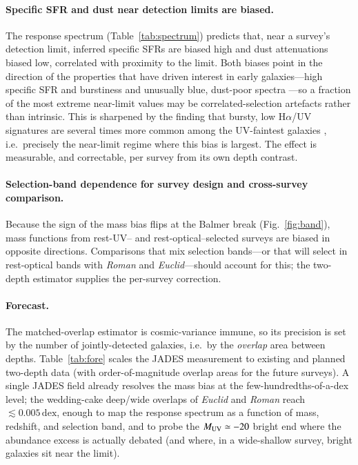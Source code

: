 \documentclass{aa}
\newcommand{\dex}{\,\mathrm{dex}}
\begin{document}
\paragraph{Specific SFR and dust near detection limits are biased.} The response spectrum
(Table~\ref{tab:spectrum}) predicts that, near a survey's detection limit, inferred specific SFRs
are biased high and dust attenuations biased low, correlated with proximity to the limit. Both
biases point in the direction of the properties that have driven interest in early galaxies---high
specific SFR and burstiness \citep{Ciesla2024,Endsley2024} and unusually blue, dust-poor spectra
\citep{Topping2022,Cullen2024}---so a fraction of the most extreme near-limit values may be
correlated-selection artefacts rather than intrinsic. This is sharpened by the finding that bursty,
low H$\alpha$/UV signatures are several times more common among the UV-faintest galaxies
\citep{Endsley2024}, i.e.\ precisely the near-limit regime where this bias is largest. The effect is measurable, and correctable,
per survey from its own depth contrast.

\paragraph{Selection-band dependence for survey design and cross-survey comparison.} Because the
sign of the mass bias flips at the Balmer break (Fig.~\ref{fig:band}), mass functions from
rest-UV-- and rest-optical--selected surveys are biased in opposite directions. Comparisons that
mix selection bands---or that will select in rest-optical bands with \emph{Roman} and
\emph{Euclid}---should account for this; the two-depth estimator supplies the per-survey correction.

\paragraph{Forecast.} The matched-overlap estimator is cosmic-variance immune, so its precision is
set by the number of jointly-detected galaxies, i.e.\ by the \emph{overlap} area between depths.
Table~\ref{tab:fore} scales the JADES measurement to existing and planned two-depth data (with
order-of-magnitude overlap areas for the future surveys). A single JADES field already resolves the
mass bias at the few-hundredths-of-a-dex level; the wedding-cake deep/wide overlaps of \emph{Euclid}
and \emph{Roman} reach $\lesssim0.005\dex$, enough to map the
response spectrum as a function of mass, redshift, and selection band, and to probe the
$M_{\rm UV}\simeq-20$ bright end where the abundance excess is actually debated (and where, in a
wide-shallow survey, bright galaxies sit near the limit).
\end{document}
